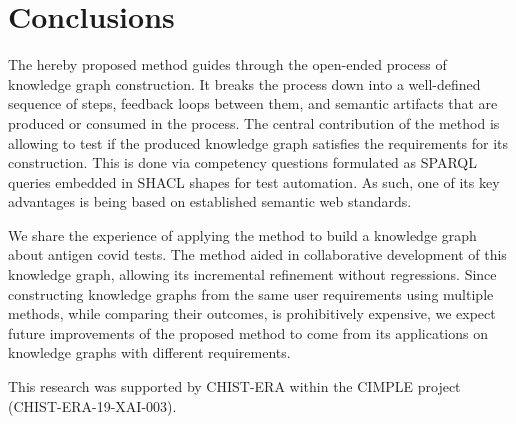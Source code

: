 \documentclass[
]{ceurart}
\begin{document}
\section{Conclusions}
The hereby proposed method guides through the open-ended process of knowledge graph construction. It breaks the process down into a well-defined sequence of steps, feedback loops between them, and semantic artifacts that are produced or consumed in the process. The central contribution of the method is allowing to test if the produced knowledge graph satisfies the requirements for its construction. This is done via competency questions formulated as SPARQL queries embedded in SHACL shapes for test automation. As such, one of its key advantages is being based on established semantic web standards.

We share the experience of applying the method to build a knowledge graph about antigen covid tests. The method aided in collaborative development of this knowledge graph, allowing its incremental refinement without regressions. Since constructing knowledge graphs from the same user requirements using multiple methods, while comparing their outcomes, is prohibitively expensive, we expect future improvements of the proposed method to come from its applications on knowledge graphs with different requirements.

\begin{acknowledgments}
  This research was supported by CHIST-ERA within the CIMPLE project (CHIST-ERA-19-XAI-003).
\end{acknowledgments}

\end{document}
